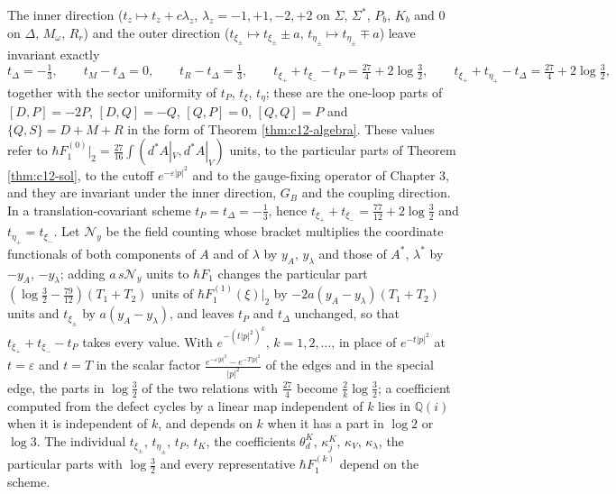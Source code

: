 \begin{corollary}
\label{cor:c12-inv}
The inner direction ($t_z\mapsto t_z+c\lambda_z$, $\lambda_z=-1,+1,-2,+2$ on $\Sigma$, $\Sigma^*$, $P_b$, $K_b$ and $0$ on $\Delta$, $M_\omega$, $R_r$) and the outer direction ($t_{\xi_\pm}\mapsto t_{\xi_\pm}\pm a$, $t_{\eta_\pm}\mapsto t_{\eta_\pm}\mp a$) leave invariant exactly
\[
t_\Delta=-\tfrac13,\qquad t_M-t_\Delta=0,\qquad t_R-t_\Delta=\tfrac13,\qquad t_{\xi_+}+t_{\xi_-}-t_P=\tfrac{27}4+2\log\tfrac32,\qquad t_{\xi_+}+t_{\eta_+}-t_\Delta=\tfrac{27}4+2\log\tfrac32,
\]
together with the sector uniformity of $t_P$, $t_\xi$, $t_\eta$; these are the one-loop parts of $[D,P]=-2P$, $[D,Q]=-Q$, $[Q,P]=0$, $[Q,Q]=P$ and $\{Q,S\}=D+M+R$ in the form of Theorem \ref{thm:c12-algebra}. These values refer to $\hbar F_1^{(0)}|_2=\tfrac{27}{16}\int(d^*A|_V,d^*A|_V)$ units, to the particular parts of Theorem \ref{thm:c12-sol}, to the cutoff $e^{-\varepsilon|p|^2}$ and to the gauge-fixing operator of Chapter 3, and they are invariant under the inner direction, $G_B$ and the coupling direction. In a translation-covariant scheme $t_P=t_\Delta=-\tfrac13$, hence $t_{\xi_+}+t_{\xi_-}=\tfrac{77}{12}+2\log\tfrac32$ and $t_{\eta_+}=t_{\xi_-}$. Let $\mathcal N_y$ be the field counting whose bracket multiplies the coordinate functionals of both components of $A$ and of $\lambda$ by $y_A$, $y_\lambda$ and those of $A^*$, $\lambda^*$ by $-y_A$, $-y_\lambda$; adding $a\,s\mathcal N_y$ units to $\hbar F_1$ changes the particular part $(\log\tfrac32-\tfrac{79}{12})(T_1+T_2)$ units of $\hbar F_1^{(1)}(\xi)|_2$ by $-2a(y_A-y_\lambda)(T_1+T_2)$ units and $t_{\xi_\pm}$ by $a(y_A-y_\lambda)$, and leaves $t_P$ and $t_\Delta$ unchanged, so that $t_{\xi_+}+t_{\xi_-}-t_P$ takes every value. With $e^{-(t|p|^2)^k}$, $k=1,2,\dots$, in place of $e^{-t|p|^2}$ at $t=\varepsilon$ and $t=T$ in the scalar factor $\frac{e^{-\varepsilon|p|^2}-e^{-T|p|^2}}{|p|^2}$ of the edges and in the special edge, the parts in $\log\tfrac32$ of the two relations with $\tfrac{27}4$ become $\tfrac2k\log\tfrac32$; a coefficient computed from the defect cycles by a linear map independent of $k$ lies in $\mathbb Q(i)$ when it is independent of $k$, and depends on $k$ when it has a part in $\log2$ or $\log3$. The individual $t_{\xi_\pm}$, $t_{\eta_\pm}$, $t_P$, $t_K$, the coefficients $\theta^K_d$, $\kappa^K_j$, $\kappa_V$, $\kappa_\lambda$, the particular parts with $\log\tfrac32$ and every representative $\hbar F_1^{(k)}$ depend on the scheme.
\end{corollary}

